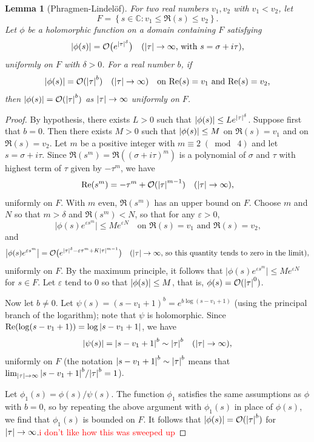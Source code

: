 \documentclass[10pt,leqno,twoside,b5paper]{article}
\theoremstyle{plain}
\newtheorem{lemma}[lem]{Lemma}
\theoremstyle{definition}
\numberwithin{equation}{section}
\numberwithin{lem}{section}
\newcommand{\cbr}[1]{\left\{#1\right\}}
\newcommand{\smod}[1]{\;(\bmod\; #1)}
\newcommand{\sai}[1]{\textcolor{red}{#1}}
\begin{document}
\begin{lemma}[Phragmen-Lindel\"of]\label{lem: miyake lem 4.3.4}
    For two real numbers $v_1,v_2$ with $v_1<v_2$, let 
    \[F = \cbr{s\in \mathbb C : v_1\leq \Re(s)\leq v_2}.\] Let $\phi$ be a holomorphic function on a domain containing $F$ satisfying \[\abs{\phi(s)} = \mathcal O\big(e^{\abs{\tau}^\delta}\big)\quad \textup{($\abs{\tau}\to\infty$, with $s = \sigma + i\tau$),}\]
    uniformly on $F$ with $\delta >0$. For a real number $b$, if 
    \[\abs{\phi(s)} = \mathcal O(\abs{\tau}^b)\quad (\abs{\tau}\to\infty) \quad \text{on $\Re(s) = v_1$ and $\Re(s) = v_2$,}\]
    then $\abs{\phi(s)} = \mathcal O(\abs{\tau}^b)$ as $\abs{\tau}\to\infty$ uniformly on $F$.
\end{lemma}
\begin{proof}
    By hypothesis, there exists $L>0$ such that $\abs{\phi(s)}\leq Le^{\abs{\tau}^\delta}$. Suppose first that $b = 0$. Then there exists $M>0$ such that $\abs{\phi(s)}\leq M$ on $\Re(s) = v_1$ and on $\Re(s) = v_2$. Let $m$ be a positive integer with $m\equiv 2\smod 4$ and let $s = \sigma + i \tau$. Since $\Re(s^m) = \Re((\sigma  + i\tau)^m)$ is a polynomial of $\sigma$ and $\tau$ with highest term of $\tau$ given by $-\tau^m$, we have 
    \[\Re(s^m) = -\tau^m + \mathcal O(\abs{\tau}^{m-1})\quad (\abs{\tau}\to\infty),\] uniformly on $F$. With $m$ even, $\Re(s^m)$ has an upper bound on $F$. Choose $m$ and $N$ so that $m>\delta$ and $\Re(s^m)<N$, so that for any $\varepsilon>0$,
    \[\big|\phi(s)e^{\varepsilon s^m}\big|\leq Me^{\varepsilon N}\quad \text{on $\Re(s) = v_1$ and $\Re(s) = v_2$,}\]
    and
    \[\big|\phi(s)e^{\varepsilon s^m}\big| = \mathcal O\big(e^{\abs{\tau}^\delta -\varepsilon\tau^m + K\abs{\tau}^{m-1}}\big)\quad (\abs{\tau}\to\infty\text{, so this quantity tends to zero in the limit}),\] uniformly on $F$. By the maximum principle, it follows that $\big|\phi(s)e^{\varepsilon s^m}\big|\leq Me^{\varepsilon N}$ for $s\in F$. Let $\varepsilon$ tend to $0$ so that $\abs{\phi(s)}\leq M$, that is, $\phi(s) = \mathcal O(\abs{\tau}^0)$.

    Now let $b\neq 0$. Let $\psi(s) = (s-v_1+1)^b = e^{b\log(s-v_1+1)}$ (using the principal branch of the logarithm); note that $\psi$ is holomorphic. Since $\Re(\log(s-v_1+1)) = \log\abs{s-v_1+1}$, we have 
    \[\abs{\psi(s)} = \abs{s-v_1+1}^b\sim \abs{\tau}^b\quad (\abs{\tau}\to\infty),\] uniformly on $F$ (the notation $\abs{s-v_1+1}^b\sim \abs{\tau}^b$ means that $\lim_{\abs{\tau}\to\infty} \abs{s-v_1+1}^b/\abs{\tau}^b = 1$).

    Let $\phi_1(s) = \phi(s)/\psi(s)$. The function $\phi_1$ satisfies the same assumptions as $\phi$ with $b = 0$, so by repeating the above argument with $\phi_1(s)$ in place of $\phi(s)$, we find that $\phi_1(s)$ is bounded on $F$. It follows that $\abs{\phi(s)} = \mathcal O(\abs{\tau}^b)$ for $\abs{\tau}\to\infty$.\sai{i don't like how this was sweeped up}
\end{proof}
\end{document}
